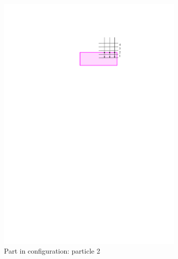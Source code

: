 \documentclass[letterpaper, 10 pt, conference]{ieeeconf}
\begin{document}
\begin{figure}
\begin{subfigure}[b]{0.2\linewidth}
        \includegraphics[width=\textwidth, clip, trim=4.2in 8.4in 2.5in 1.7in]{bins_p2}
        \caption{Part in configuration: particle 2}
        \label{bins:p2}
    \end{subfigure}
    \hfill
    \begin{subfigure}[b]{0.2\linewidth}

\end{subfigure}
\end{figure}
\end{document}

